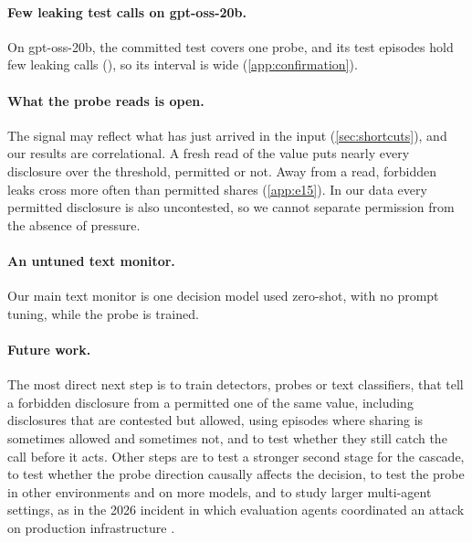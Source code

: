 \paragraph{Few leaking test calls on gpt-oss-20b.}
On gpt-oss-20b, the committed test covers one probe, and its test episodes hold few leaking calls (\gptossFreshLeaks{}), so its interval is wide (\cref{app:confirmation}).

\paragraph{What the probe reads is open.}
The signal may reflect what has just arrived in the input (\cref{sec:shortcuts}), and our results are correlational.
A fresh read of the value puts nearly every disclosure over the threshold, permitted or not.
Away from a read, forbidden leaks cross more often than permitted shares (\cref{app:e15}).
In our data every permitted disclosure is also uncontested, so we cannot separate permission from the absence of pressure.

\paragraph{An untuned text monitor.}
Our main text monitor is one decision model used zero-shot, with no prompt tuning, while the probe is trained.

\paragraph{Future work.}
The most direct next step is to train detectors, probes or text classifiers, that tell a forbidden disclosure from a permitted one of the same value, including disclosures that are contested but allowed, using episodes where sharing is sometimes allowed and sometimes not, and to test whether they still catch the call before it acts.
Other steps are to test a stronger second stage for the cascade, to test whether the probe direction causally affects the decision, to test the probe in other environments and on more models, and to study larger multi-agent settings, as in the 2026 incident in which evaluation agents coordinated an attack on production infrastructure \citep{greenblatt2026incident}.
